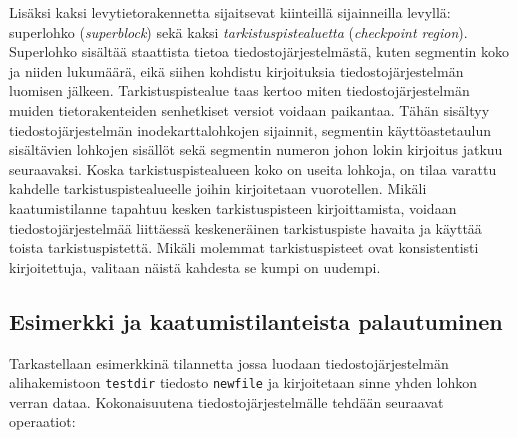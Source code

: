 Lisäksi kaksi levytietorakennetta sijaitsevat kiinteillä sijainneilla levyllä: superlohko (\emph{superblock}) sekä kaksi \emph{tarkistuspistealuetta} (\emph{checkpoint region}).
Superlohko sisältää staattista tietoa tiedostojärjestelmästä,
kuten segmentin koko ja niiden lukumäärä, eikä siihen kohdistu kirjoituksia tiedostojärjestelmän luomisen jälkeen.
Tarkistuspistealue taas kertoo miten tiedostojärjestelmän muiden tietorakenteiden senhetkiset versiot voidaan paikantaa.
Tähän sisältyy tiedostojärjestelmän inodekarttalohkojen sijainnit, segmentin käyttöastetaulun sisältävien lohkojen sisällöt sekä segmentin numeron johon lokin kirjoitus jatkuu seuraavaksi.
Koska tarkistuspistealueen koko on useita lohkoja, on tilaa varattu kahdelle tarkistuspistealueelle joihin kirjoitetaan vuorotellen.
Mikäli kaatumistilanne tapahtuu kesken tarkistuspisteen kirjoittamista, voidaan tiedostojärjestelmää liittäessä keskeneräinen tarkistuspiste havaita ja käyttää toista tarkistuspistettä.
Mikäli molemmat tarkistuspisteet ovat konsistentisti kirjoitettuja, valitaan näistä kahdesta se kumpi on uudempi.

\subsection{Esimerkki ja kaatumistilanteista palautuminen}
\label{SubsectSpriteLfsExample}

Tarkastellaan esimerkkinä tilannetta jossa luodaan tiedostojärjestelmän alihakemistoon \texttt{testdir} tiedosto \texttt{newfile} ja kirjoitetaan sinne yhden lohkon verran dataa.
Kokonaisuutena tiedostojärjestelmälle tehdään seuraavat operaatiot:

